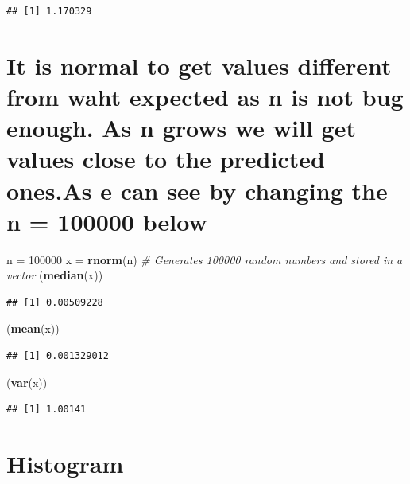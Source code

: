 \documentclass[]{article}
\newenvironment{Shaded}{\begin{snugshade}}{\end{snugshade}}
\newcommand{\KeywordTok}[1]{\textcolor[rgb]{0.13,0.29,0.53}{\textbf{#1}}}
\newcommand{\DecValTok}[1]{\textcolor[rgb]{0.00,0.00,0.81}{#1}}
\newcommand{\StringTok}[1]{\textcolor[rgb]{0.31,0.60,0.02}{#1}}
\newcommand{\CommentTok}[1]{\textcolor[rgb]{0.56,0.35,0.01}{\textit{#1}}}
\newcommand{\NormalTok}[1]{#1}
\begin{document}
\begin{verbatim}
## [1] 1.170329
\end{verbatim}

\section{It is normal to get values different from waht expected as n is
not bug enough. As n grows we will get values close to the predicted
ones.As e can see by changing the n = 100000
below}\label{it-is-normal-to-get-values-different-from-waht-expected-as-n-is-not-bug-enough.-as-n-grows-we-will-get-values-close-to-the-predicted-ones.as-e-can-see-by-changing-the-n-100000-below}

\begin{Shaded}
\begin{Highlighting}[]
\NormalTok{n =}\StringTok{ }\DecValTok{100000}
\NormalTok{x =}\StringTok{ }\KeywordTok{rnorm}\NormalTok{(n) }\CommentTok{# Generates 100000 random numbers and stored in a vector}
\NormalTok{(}\KeywordTok{median}\NormalTok{(x))}
\end{Highlighting}
\end{Shaded}

\begin{verbatim}
## [1] 0.00509228
\end{verbatim}

\begin{Shaded}
\begin{Highlighting}[]
\NormalTok{(}\KeywordTok{mean}\NormalTok{(x))}
\end{Highlighting}
\end{Shaded}

\begin{verbatim}
## [1] 0.001329012
\end{verbatim}

\begin{Shaded}
\begin{Highlighting}[]
\NormalTok{(}\KeywordTok{var}\NormalTok{(x))}
\end{Highlighting}
\end{Shaded}

\begin{verbatim}
## [1] 1.00141
\end{verbatim}

\section{Histogram}\label{histogram}
\end{document}
